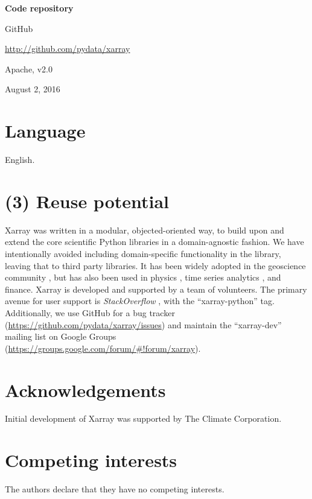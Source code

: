 \documentclass{jors}
\begin{document}
{\bf Code repository}

\begin{description}[noitemsep,topsep=0pt]
	\item[Name:] GitHub
	\item[Identifier:] \url{http://github.com/pydata/xarray}
	\item[Licence:] Apache, v2.0
	\item[Date published:] August 2, 2016
\end{description}

\section*{Language}

English.

\section*{(3) Reuse potential}

Xarray was written in a modular, objected-oriented way, to build upon and extend the core scientific Python libraries in a domain-agnostic fashion.
We have intentionally avoided including domain-specific functionality in the library, leaving that to third party libraries.
It has been widely adopted in the geoscience community \citep[e.g.][]{Dawson_2016a,Dawson_2016b,xgcm}, but has also been used in physics \citep[e.g.][]{pycalphad}, time series analytics \citep{cesium}, and finance.
Xarray is developed and supported by a team of volunteers. The primary avenue for user support is \textit{StackOverflow} \citep{stackoverflow}, with the ``xarray-python'' tag.
Additionally, we use GitHub for a bug tracker (\url{https://github.com/pydata/xarray/issues}) and maintain the ``xarray-dev'' mailing list on Google Groups (\url{https://groups.google.com/forum/#!forum/xarray}).

\section*{Acknowledgements}

Initial development of Xarray was supported by The Climate Corporation.

\section*{Competing interests}

The authors declare that they have no competing interests.
\end{document}
